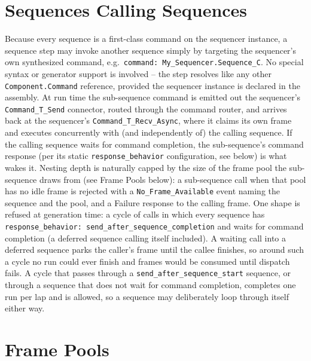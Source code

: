 
\section{Sequences Calling Sequences}

Because every sequence is a first-class command on the sequencer instance, a sequence step may invoke another sequence simply by targeting the sequencer's own synthesized command, e.g.\ \texttt{command: My\_Sequencer.Sequence\_C}. No special syntax or generator support is involved -- the step resolves like any other \texttt{Component.Command} reference, provided the sequencer instance is declared in the assembly. At run time the sub-sequence command is emitted out the sequencer's \texttt{Command\_T\_Send} connector, routed through the command router, and arrives back at the sequencer's \texttt{Command\_T\_Recv\_Async}, where it claims its own frame and executes concurrently with (and independently of) the calling sequence. If the calling sequence waits for command completion, the sub-sequence's command response (per its static \texttt{response\_behavior} configuration, see below) is what wakes it. Nesting depth is naturally capped by the size of the frame pool the sub-sequence draws from (see Frame Pools below): a sub-sequence call when that pool has no idle frame is rejected with a \texttt{No\_Frame\_Available} event naming the sequence and the pool, and a Failure response to the calling frame. One shape is refused at generation time: a cycle of calls in which every sequence has \texttt{response\_behavior: send\_after\_sequence\_completion} and waits for command completion (a deferred sequence calling itself included). A waiting call into a deferred sequence parks the caller's frame until the callee finishes, so around such a cycle no run could ever finish and frames would be consumed until dispatch fails. A cycle that passes through a \texttt{send\_after\_sequence\_start} sequence, or through a sequence that does not wait for command completion, completes one run per lap and is allowed, so a sequence may deliberately loop through itself either way.

\section{Frame Pools}

